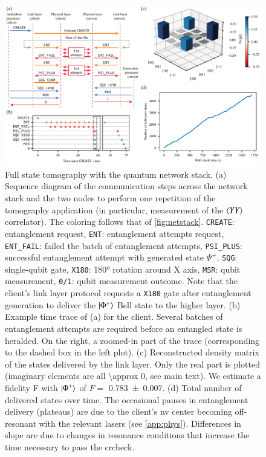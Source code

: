 \begin{figure}[t]
    \centering
    \includegraphics[width=\linewidth]{figures/fstomography.pdf}
    \caption{
        Full state tomography with the quantum network stack.
        (a) Sequence diagram of the communication steps across the network stack and the two nodes
        to perform one repetition of the tomography application (in particular, measurement of the
        $\braket{YY}$ correlator). The coloring follows that of \cref{fig:netstack}.
        \texttt{CREATE}: entanglement request, \texttt{ENT}: entanglement attempts request,
        \texttt{ENT\_FAIL}: failed the batch of entanglement attempts, \texttt{PSI\_PLUS}:
        successful entanglement attempt with generated state $\Psi^+$, \texttt{SQG}: single-qubit
        gate, \texttt{X180}: \ang{180} rotation around X axis, \texttt{MSR}: qubit measurement,
        \texttt{0/1}: qubit measurement outcome. Note that the client's link layer protocol requests
        a \texttt{X180} gate after entanglement generation to deliver the $\ket{\Phi^+}$ Bell state
        to the higher layer.
        (b) Example time trace of (a) for the client. Several batches of entanglement attempts are
        required before an entangled state is heralded. On the right, a zoomed-in part of the trace
        (corresponding to the dashed box in the left plot).
        (c) Reconstructed density matrix of the states delivered by the link layer. Only the real
        part is plotted (imaginary elements are all \num{\approx 0}, see main text). We estimate a
        fidelity F with $\ket{\Phi^+}$ of $F =$ \num{0.783(7)}.
        (d) Total number of delivered states over time. The occasional pauses in entanglement
        delivery (plateaus) are due to the client's \acrshort{nv} center becoming off-resonant with
        the relevant lasers (see \cref{app:phys}). Differences in slope are due to changes in
        resonance conditions that increase the time necessary to pass the \acrlong{crcheck}.
    }
    \label{fig:fstomography}
\end{figure}

